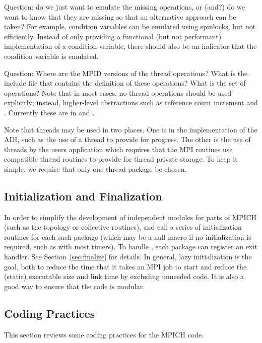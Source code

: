 \documentclass{article}
\begin{document}
Question: do we just want to emulate the missing operations, or (and?)
do we want to know that they are missing so that an alternative
approach can be taken?  For example, condition variables can be emulated using
spinlocks, but not efficiently.  Instead of only providing a functional (but
not performant) implementation of a condition variable, there should also be
an indicator that the condition variable is emulated.

Question: Where are the MPID versions of the thread operations?  What
is the include file that contains the definition of these operations?
What is the set of operations?  Note that in most cases, no thread
operations should be used explicitly; instead, higher-level
abstractions such as reference count increment and
. 
Currently these are in  and
.  

Note that threads may be used in two places.  One is in the
implementation of the ADI, such as the use of a thread to provide for
progress.  The other is the use of threads by the users application
which requires that the MPI routines use compatible thread routines to
provide for thread private storage.  To keep it simple, we require
that only one thread package be chosen.

\subsection{Initialization and Finalization}
\label{sec:initialization}
In order to simplify the development of independent modules for parts
of MPICH (such as the topology or collective routines),
 and  call a series of
initialization routines for each such package (which may be a null
macro if no initialization is required, such as with most timers).  To handle
, each package can register an exit handler.  See
Section~\ref{sec:finalize} for details.
In general, lazy initialization is the goal, both to reduce the time
that it takes an MPI job to start and reduce the (static) executable
size and link time by excluding unneeded code.  It is also a good way
to ensure that the code is modular.

\subsection{Coding Practices}
\label{sec:coding-practices}
This section reviews some coding practices for the MPICH code.
\end{document}
